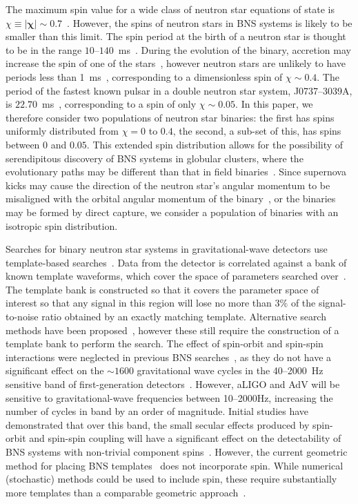 The maximum spin value for a wide class of neutron star equations of state is
$\chi \equiv \left| \bm{\chi} \right| \sim 0.7$~\cite{Lo:2010bj}. However, the spins of neutron stars in BNS
systems is likely to be smaller than this limit. The spin period at the birth
of a neutron star is thought to be in the range
$10$--$140$~ms~\cite{Lorimer:2008se,Mandel:2009nx}. During the evolution of
the binary, accretion may increase the spin of one of the
stars~\cite{Bildsten:1997vw}, however neutron stars are unlikely to have
periods less than 1~ms~\cite{Chakrabarty:2008gz}, corresponding to a
dimensionless spin of $\chi \sim 0.4$.  The period of the fastest known pulsar
in a double neutron star system, J0737--3039A, is
$22.70$~ms~\cite{Burgay:2003jj}, corresponding to a spin of only $\chi \sim
0.05$. In this paper, we therefore consider two populations of neutron star
binaries: the first has spins uniformly distributed from $\chi = 0$ to $0.4$,
the second, a sub-set of this, has spins between $0$ and $0.05$.  This extended spin
distribution allows for the possibility of serendipitous discovery of BNS
systems in globular clusters, where the evolutionary paths may be different
than that in field binaries~\cite{Grindlay:2005ym}. Since supernova kicks may
cause the direction of the neutron star's angular momentum to be misaligned
with the orbital angular momentum of the binary~\cite{Farr:2011gs}, or the
binaries may be formed by direct capture, we consider  a population of
binaries with an isotropic spin distribution.

Searches
for binary neutron star systems in gravitational-wave detectors use
template-based searches~\cite{Allen:2005fk}. Data from the detector is
correlated against a bank of known template waveforms, which cover the space
of parameters searched over~\cite{OwenSathyaprakash98}. The template bank is
constructed so that it covers the parameter space of interest
so that any signal in this region will lose no more
than $3\%$ of the signal-to-noise ratio obtained by an exactly matching
template. Alternative search methods have been proposed~\cite{Marion:2004,Cannon:2010qh},
however these still require the construction of a template bank to perform the
search.
The effect of spin-orbit and spin-spin interactions were neglected in previous
BNS searches~\cite{Abadie:2011nz}, as they do not have a significant effect on
the $\sim 1600$ gravitational wave cycles in the 40--2000~Hz sensitive band of
first-generation detectors~\cite{Apostolatos:1996rf}. However, aLIGO and AdV
will be sensitive to gravitational-wave frequencies between 10--2000Hz,
increasing the number of cycles in band by an order of magnitude.
Initial studies have demonstrated that over this band, the small secular
effects produced by spin-orbit and spin-spin coupling will have a significant
effect on the detectability of BNS systems with non-trivial component
spins~\cite{Ajith:2011ec}. However, the current geometric method for placing
BNS templates~\cite{Bank06} does not incorporate spin. While numerical
(stochastic) methods could be used to include spin, these require
substantially more templates than a comparable geometric
approach~\cite{Harry:2009ea}. 

